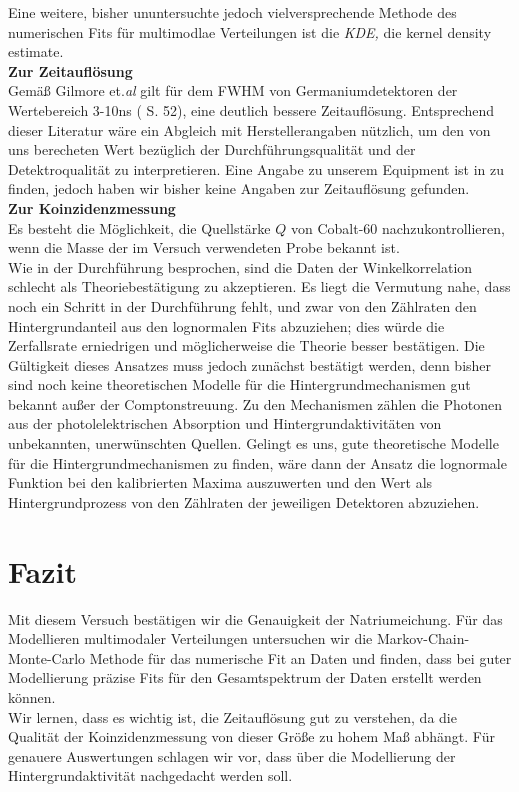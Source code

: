 \documentclass[%
aps,
onecolumn,
11pt,
tightenlines,
nofootinbib,
superscriptaddress,
floatfix,
prd,
]{revtex4-2}
\begin{document}
Eine weitere, bisher ununtersuchte jedoch vielversprechende Methode des numerischen Fits für multimodlae Verteilungen ist die \textit{KDE,} die kernel density estimate.\vspace{10pt}\\
\textbf{Zur Zeitauflösung}\\
Gemäß Gilmore et.\textit{al} gilt für dem FWHM von Germaniumdetektoren der Wertebereich 3-10ns (\cite{gilmore2008practical} S. 52), eine deutlich bessere Zeitauflösung. Entsprechend dieser Literatur wäre ein Abgleich mit Herstellerangaben nützlich, um den von uns berecheten Wert bezüglich der Durchführungsqualität und der Detektroqualität zu interpretieren. Eine Angabe zu unserem Equipment ist in \cite{ortec} zu finden, jedoch haben wir bisher keine Angaben zur Zeitauflösung gefunden.\vspace{10pt}\\
\textbf{Zur Koinzidenzmessung}\\
Es besteht die Möglichkeit, die Quellstärke $Q$ von Cobalt-60 nachzukontrollieren, wenn die Masse der im Versuch verwendeten Probe bekannt ist.\\
Wie in der Durchführung besprochen, sind die Daten der Winkelkorrelation schlecht als Theoriebestätigung zu akzeptieren. Es liegt die Vermutung nahe, dass noch ein Schritt in der Durchführung fehlt, und zwar von den Zählraten den Hintergrundanteil aus den lognormalen Fits abzuziehen; dies würde die Zerfallsrate erniedrigen und möglicherweise die Theorie besser bestätigen. Die Gültigkeit dieses Ansatzes muss jedoch zunächst bestätigt werden, denn bisher sind noch keine theoretischen Modelle für die Hintergrundmechanismen gut bekannt außer der Comptonstreuung. Zu den Mechanismen zählen die Photonen aus der photolelektrischen Absorption und Hintergrundaktivitäten von unbekannten, unerwünschten Quellen. Gelingt es uns, gute theoretische Modelle für die Hintergrundmechanismen zu finden, wäre dann der Ansatz die lognormale Funktion bei den kalibrierten Maxima auszuwerten und den Wert als Hintergrundprozess von den Zählraten der jeweiligen Detektoren abzuziehen. 





\section{Fazit}
\label{sec:Fazit}
Mit diesem Versuch bestätigen wir die Genauigkeit der Natriumeichung. Für das Modellieren multimodaler Verteilungen untersuchen wir die Markov-Chain-Monte-Carlo Methode für das numerische Fit an Daten und finden, dass bei guter Modellierung präzise Fits für den Gesamtspektrum der Daten erstellt werden können. \\
Wir lernen, dass es wichtig ist, die Zeitauflösung gut zu verstehen, da die Qualität der Koinzidenzmessung von dieser Größe zu hohem Maß abhängt. Für genauere Auswertungen schlagen wir vor, dass über die Modellierung der Hintergrundaktivität nachgedacht werden soll. 
\end{document}
